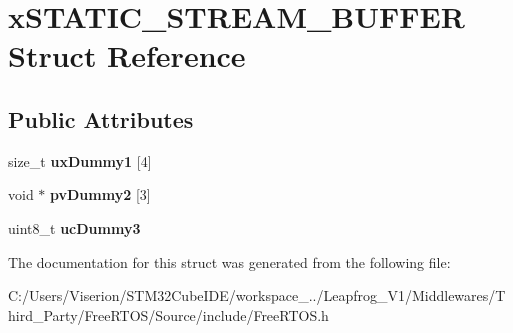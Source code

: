 \hypertarget{structx_s_t_a_t_i_c___s_t_r_e_a_m___b_u_f_f_e_r}{}\section{x\+S\+T\+A\+T\+I\+C\+\_\+\+S\+T\+R\+E\+A\+M\+\_\+\+B\+U\+F\+F\+ER Struct Reference}
\label{structx_s_t_a_t_i_c___s_t_r_e_a_m___b_u_f_f_e_r}
\subsection*{Public Attributes}
\begin{DoxyCompactItemize}
\item 
\mbox{\label{structx_s_t_a_t_i_c___s_t_r_e_a_m___b_u_f_f_e_r_a9020496ea46d0d95451ed11b3193fa09}} 
size\+\_\+t {\bfseries ux\+Dummy1} \mbox{[}4\mbox{]}
\item 
\mbox{\label{structx_s_t_a_t_i_c___s_t_r_e_a_m___b_u_f_f_e_r_a7603bb483828c39906839c90c4e70fe9}} 
void $\ast$ {\bfseries pv\+Dummy2} \mbox{[}3\mbox{]}
\item 
\mbox{\label{structx_s_t_a_t_i_c___s_t_r_e_a_m___b_u_f_f_e_r_a7a6df8a6f408f01b245c0c90732dea72}} 
uint8\+\_\+t {\bfseries uc\+Dummy3}
\end{DoxyCompactItemize}


The documentation for this struct was generated from the following file\+:\begin{DoxyCompactItemize}
\item 
C\+:/\+Users/\+Viserion/\+S\+T\+M32\+Cube\+I\+D\+E/workspace\+\_../\+Leapfrog\+\_\+\+V1/\+Middlewares/\+Third\+\_\+\+Party/\+Free\+R\+T\+O\+S/\+Source/include/Free\+R\+T\+O\+S.\+h\end{DoxyCompactItemize}
